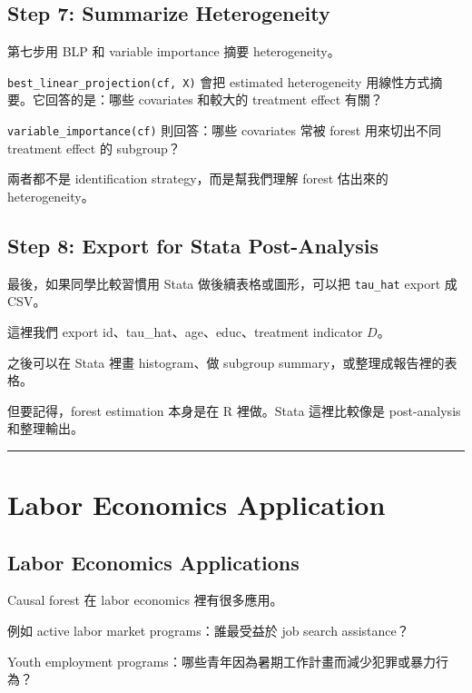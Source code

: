 \documentclass[
  chinese,
  11pt,
]{article}
\begin{document}
\subsection{Step 7: Summarize
Heterogeneity}\label{step-7-summarize-heterogeneity}

第七步用 BLP 和 variable importance 摘要 heterogeneity。

\texttt{best\_linear\_projection(cf,\ X)} 會把 estimated heterogeneity
用線性方式摘要。它回答的是：哪些 covariates 和較大的 treatment effect
有關？

\texttt{variable\_importance(cf)} 則回答：哪些 covariates 常被 forest
用來切出不同 treatment effect 的 subgroup？

兩者都不是 identification strategy，而是幫我們理解 forest 估出來的
heterogeneity。

\subsection{Step 8: Export for Stata
Post-Analysis}\label{step-8-export-for-stata-post-analysis}

最後，如果同學比較習慣用 Stata 做後續表格或圖形，可以把
\texttt{tau\_hat} export 成 CSV。

這裡我們 export id、tau\_hat、age、educ、treatment indicator \(D\)。

之後可以在 Stata 裡畫 histogram、做 subgroup
summary，或整理成報告裡的表格。

但要記得，forest estimation 本身是在 R 裡做。Stata 這裡比較像是
post-analysis 和整理輸出。

\begin{center}\rule{0.5\linewidth}{0.5pt}\end{center}

\section{Labor Economics Application}\label{labor-economics-application}

\subsection{Labor Economics
Applications}\label{labor-economics-applications}

Causal forest 在 labor economics 裡有很多應用。

例如 active labor market programs：誰最受益於 job search assistance？

Youth employment
programs：哪些青年因為暑期工作計畫而減少犯罪或暴力行為？
\end{document}
